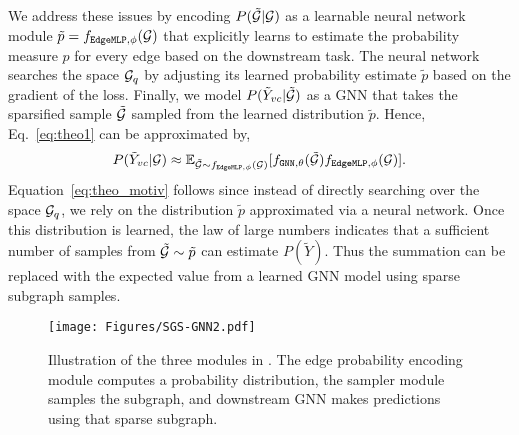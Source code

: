 We address these issues by encoding $P(\tilde{{\mathcal{G}}}|{\mathcal{G}})$ as a learnable neural network module $\tilde{p} = f_{\texttt{EdgeMLP},\phi}({\mathcal{G}})$ that explicitly learns to estimate the probability measure $p$ for every edge based on the downstream task. The neural network searches the space ${\mathcal{G}}_q$ by adjusting its learned probability estimate $\tilde{p}$ based on the gradient of the loss. Finally, we model $P(\tilde{Y}_{vc}|\tilde{{\mathcal{G}}})$ as a GNN that takes the sparsified sample $\tilde{{\mathcal{G}}}$ sampled from the learned distribution $\tilde{p}$. Hence, Eq.~\ref{eq:theo1} can be approximated by,
\vspace{-3pt}
\begin{equation}
\label{eq:theo_motiv}
P(\tilde{Y}_{vc}|{\mathcal{G}}) \approx \mathbb{E}_{\tilde{{\mathcal{G}}}\sim f_{\texttt{EdgeMLP},\phi}({\mathcal{G}})} [f_{\texttt{GNN},\theta}(\tilde{{\mathcal{G}}})f_{\texttt{EdgeMLP},\phi} ({\mathcal{G}})].
\end{equation}
Equation~\ref{eq:theo_motiv} follows since 
instead of directly searching over the space ${\mathcal{G}}_q$, we rely on the distribution $\tilde{p}$ approximated via a neural network. Once this distribution is learned, the law of large numbers indicates that a sufficient number of samples from $\tilde{{\mathcal{G}}} \sim \tilde{p}$ can estimate $P(\tilde{Y})$. Thus the summation can be replaced with the expected value from a learned GNN model using sparse subgraph samples. 
\begin{figure*}[t]
	\centering
	\texttt{[image: Figures/SGS-GNN2.pdf]}
	\caption{Illustration of the three modules in \sgs. The edge probability encoding module computes a probability distribution, the sampler module samples the subgraph, and downstream GNN makes predictions using that sparse subgraph.
	}
	\label{fig:sgsarchitecture}
\end{figure*}